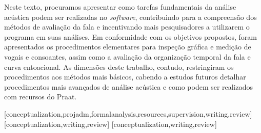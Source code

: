 \documentclass[portuguese]{textolivre}
\begin{document}
Neste texto, procuramos apresentar como tarefas fundamentais da análise acústica podem ser realizadas no \textit{software}, contribuindo para a compreensão dos métodos de avaliação da fala e incentivando mais pesquisadores a utilizarem o programa em suas análises. Em conformidade com os objetivos propostos, foram apresentados os procedimentos elementares para inspeção gráfica e medição de vogais e consoantes, assim como a avaliação da organização temporal da fala e curva entoacional. As dimensões deste trabalho, contudo, restringiram os procedimentos aos métodos mais básicos, cabendo a estudos futuros detalhar procedimentos mais avançados de análise acústica e como podem ser realizados com recursos do Praat.


\printbibliography\label{sec-bib}


\begin{contributors}
[conceptualization,projadm,formalanalysis,resources,supervision,writing,review]
[conceptualization,writing,review]
[conceptualization,writing,review]
\end{contributors}
\end{document}
